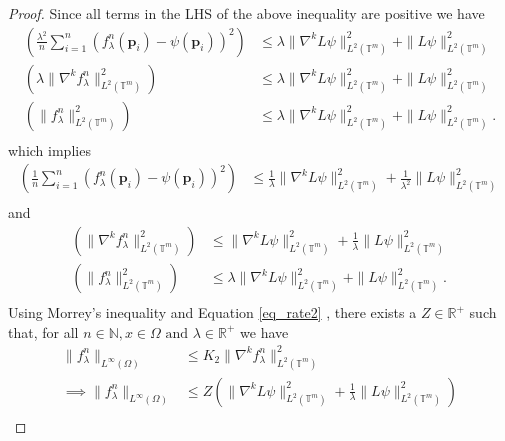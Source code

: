\documentclass[multixcb]{amstext-l}
\theoremstyle{plain}
\theoremstyle{definition}
\theoremstyle{definition}
\theoremstyle{remark}
\numberwithin{equation}{chapter}
\begin{document}
\begin{proof}
Since all terms in the LHS of the above inequality are positive we have   \begin{equation}
\label{eq_rate_inter}
\begin{aligned}
\left( \frac{\lambda^2}{n}\sum\limits_{i=1}^{n}(f^n_{\lambda}(\boldsymbol{p}_i)-\psi(\boldsymbol{p}_i))^2 \right) &\le \lambda\|\nabla^kL\psi\|_{L^2(\mathbb{T}^m)}^2 + \|L\psi\|_{L^2(\mathbb{T}^m)}^2\\
\left( \lambda\|\nabla^kf^n_{\lambda}\|_{L^2(\mathbb{T}^m)}^2 \right) &\le \lambda\|\nabla^kL\psi\|_{L^2(\mathbb{T}^m)}^2 + \|L\psi\|_{L^2(\mathbb{T}^m)}^2\\
\left( \|f^n_{\lambda}\|_{L^2(\mathbb{T}^m)}^2 \right) &\le \lambda\|\nabla^kL\psi\|_{L^2(\mathbb{T}^m)}^2 + \|L\psi\|_{L^2(\mathbb{T}^m)}^2.\\
\end{aligned}
\end{equation}
which implies \begin{equation}\label{eq_rate}
\begin{aligned}
\left( \frac{1}{n}\sum\limits_{i=1}^{n}(f^n_{\lambda}(\boldsymbol{p}_i)-\psi(\boldsymbol{p}_i))^2 \right) &\le \frac{1}{\lambda}\|\nabla^kL\psi\|_{L^2(\mathbb{T}^m)}^2 + \frac{1}{\lambda^2}\|L\psi\|_{L^2(\mathbb{T}^m)}^2 \\
\end{aligned}
\end{equation}and
\begin{equation}\label{eq_rate2}
\begin{aligned}
\left( \|\nabla^kf^n_{\lambda}\|_{L^2(\mathbb{T}^m)}^2 \right) &\le \|\nabla^kL\psi\|_{L^2(\mathbb{T}^m)}^2 +\frac{1}{\lambda} \|L\psi\|_{L^2(\mathbb{T}^m)}^2\\
\left( \|f^n_{\lambda}\|_{L^2(\mathbb{T}^m)}^2 \right) &\le \lambda\|\nabla^kL\psi\|_{L^2(\mathbb{T}^m)}^2 + \|L\psi\|_{L^2(\mathbb{T}^m)}^2.\\
\end{aligned}
\end{equation}
Using Morrey's inequality and Equation \ref{eq_rate2} , there exists a $Z\in\mathbb{R}^+$ such that, for all $n\in\mathbb{N},x\in\Omega \mbox{ and }\lambda\in\mathbb{R}^+$ we have \begin{equation}\label{eq_rate3}\begin{aligned}
\|f^n_{\lambda}\|_{L^{\infty}(\Omega)} &\le K_2\|\nabla^kf^n_{\lambda}\|_{L^2(\mathbb{T}^m)}^2  \\
\implies \|f^n_{\lambda}\|_{L^{\infty}(\Omega)} &\le Z\left(\|\nabla^kL\psi\|_{L^2(\mathbb{T}^m)}^2 +\frac{1}{\lambda} \|L\psi\|_{L^2(\mathbb{T}^m)}^2\right)\\

\end{aligned}
\end{equation}
\end{proof}
\end{document}
